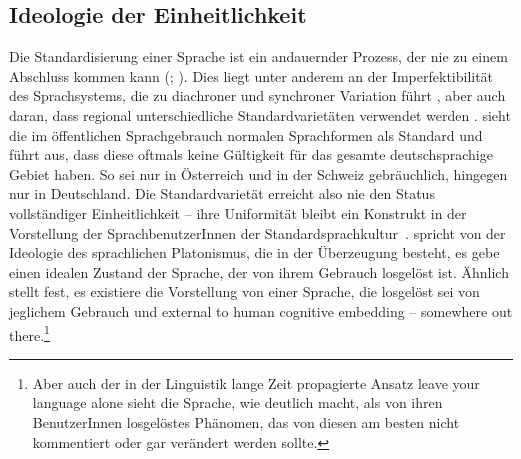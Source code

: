 \subsection{Ideologie der Einheitlichkeit}
\label{sec:Einheitlichkeit}
Die Standardisierung einer Sprache ist ein andauernder Prozess, der nie zu einem Abschluss kommen kann (\citealp[s.][22]{Milroy1991}; \citealp[534]{Milroy2001}). 
Dies liegt unter anderem an der Imperfektibilität des Sprachsystems, die zu diachroner und synchroner Variation führt \citep[s.][]{Antos2003}, aber auch daran, dass regional unterschiedliche Standardvarietäten verwendet werden \citep[s.][]{Ammon.2005}. \citet[29]{Ammon.2005} sieht \glqq die im öffentlichen Sprachgebrauch normalen Sprachformen\grqq{} als Standard und führt aus, dass diese oftmals keine Gültigkeit für das gesamte deutschsprachige Gebiet haben. 
So sei  nur in Österreich %
und in der Schweiz %
gebräuchlich,  hingegen nur in Deutschland. 
Die Standardvariet{\"a}t erreicht also nie den Status vollst{\"a}ndiger Einheitlichkeit -- ihre Uniformit{\"a}t bleibt ein Konstrukt in der Vorstellung der SprachbenutzerInnen der Standardsprachkultur~\citep[s.][134]{Milroy.2007}. 
\citet[17]{Maitz.2015} spricht von der Ideologie des sprachlichen Platonismus, die in der {\"U}berzeugung besteht, es gebe einen idealen Zustand der Sprache, der von ihrem Gebrauch losgel{\"o}st ist. 
Ähnlich stellt \citet[55]{Preston2004} fest, es existiere die Vorstellung von einer Sprache, die losgelöst sei von jeglichem Gebrauch und \glqq external to human cognitive embedding -- somewhere \glq out there\grq \grqq.\footnote{Aber auch der in der Linguistik lange Zeit propagierte Ansatz \glqq leave your language alone\grqq{} sieht die Sprache, wie \citet[4--5]{Cameron1995} deutlich macht, als von ihren BenutzerInnen losgelöstes Phänomen, das von diesen am besten nicht kommentiert oder gar verändert werden sollte.}

